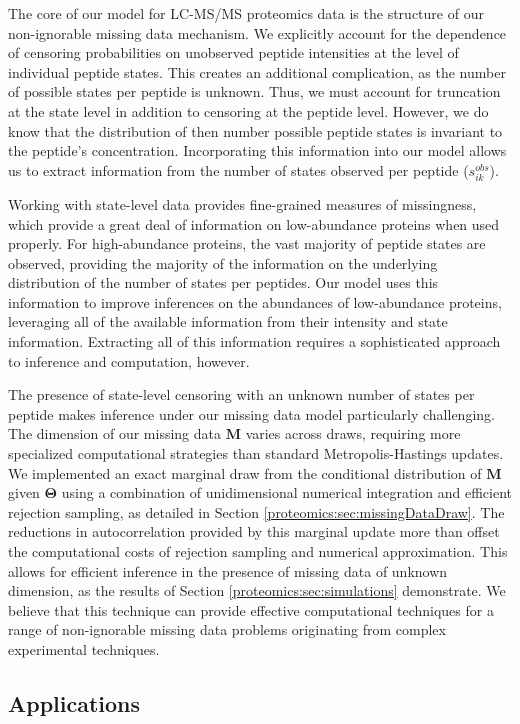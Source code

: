 The core of our model for LC-MS/MS proteomics data is the structure of our non-ignorable missing data mechanism.
We explicitly account for the dependence of censoring probabilities on unobserved peptide intensities at the level of individual peptide states.
This creates an additional complication, as the number of possible states per peptide is unknown.
Thus, we must account for truncation at the state level in addition to censoring at the peptide level.
However, we do know that the distribution of then number possible peptide states is invariant to the peptide's concentration.
Incorporating this information into our model allows us to extract information from the number of states observed per peptide ($s_{ik}^{obs}$).

Working with state-level data provides fine-grained measures of missingness, which provide a great deal of information on low-abundance proteins when used properly.
For high-abundance proteins, the vast majority of peptide states are observed, providing the majority of the information on the underlying distribution of the number of states per peptides.
Our model uses this information to improve inferences on the abundances of low-abundance proteins, leveraging all of the available information from their intensity and state information.
Extracting all of this information requires a sophisticated approach to inference and computation, however.

The presence of state-level censoring with an unknown number of states per peptide makes inference under our missing data model particularly challenging.
The dimension of our missing data $\bm M$ varies across draws, requiring more specialized computational strategies than standard Metropolis-Hastings updates.
We implemented an exact marginal draw from the conditional distribution of $\bm M$ given $\bm \Theta$ using a combination of unidimensional numerical integration and efficient rejection sampling, as detailed in Section \ref{proteomics:sec:missingDataDraw}.
The reductions in autocorrelation provided by this marginal update more than offset the computational costs of rejection sampling and numerical approximation.
This allows for efficient inference in the presence of missing data of unknown dimension, as the results of Section \ref{proteomics:sec:simulations} demonstrate.
We believe that this technique can provide effective computational techniques for a range of non-ignorable missing data problems originating from complex experimental techniques.

\subsection{Applications}


